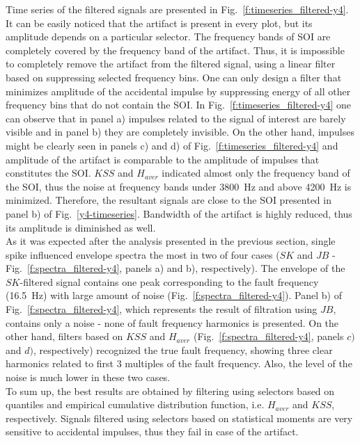 \documentclass[11pt]{article} %
\begin{document}
Time series of the filtered signals are presented in Fig.~\ref{f:timeseries_filtered-y4}. It can be easily noticed that the artifact is present in every plot, but its amplitude depends on a particular selector. The frequency bands of SOI are completely covered by the frequency band of the artifact. Thus, it is impossible to completely remove the artifact from the filtered signal, using a linear filter based on suppressing selected frequency bins. One can only design a filter that minimizes amplitude of the accidental impulse by suppressing energy of all other frequency bins that do not contain the SOI. In Fig.~\ref{f:timeseries_filtered-y4} one can observe that in panel a) impulses related to the signal of interest are barely visible and in panel b) they are completely invisible. On the other hand, impulses might be clearly seen in panels c) and d) of Fig.~\ref{f:timeseries_filtered-y4} and amplitude of the artifact is comparable to the amplitude of impulses that constitutes the SOI. $KSS$ and $H_{aver}$ indicated almost only the frequency band of the SOI, thus the noise at frequency bands under 3800~Hz and above 4200~Hz is minimized. Therefore, the resultant signals are close to the SOI presented in panel b) of Fig.~\ref{y4-timeseries}. Bandwidth of the artifact is highly reduced, thus its amplitude is diminished as well.\\
As it was expected after the analysis presented in the previous section, single spike influenced envelope spectra the most in two of four cases ($SK$ and $JB$ - Fig.~\ref{f:spectra_filtered-y4}, panels a) and b), respectively). The envelope of the $SK$-filtered signal contains one peak corresponding to the fault frequency (16.5~Hz) with large amount of noise (Fig.~\ref{f:spectra_filtered-y4}). Panel b) of Fig.~\ref{f:spectra_filtered-y4}, which represents the result of filtration using $JB$, contains only a noise - none of fault frequency harmonics is presented. On the other hand, filters based on $KSS$ and $H_{aver}$ (Fig.~\ref{f:spectra_filtered-y4}, panels $c)$ and $d)$, respectively) recognized the true fault frequency, showing three clear harmonics related to first 3 multiples of the fault frequency. Also, the level of the noise is much lower in these two cases.\\
To sum up, the best results are obtained by filtering using selectors based on quantiles and empirical cumulative distribution function, i.e. $H_{aver}$ and $KSS$, respectively. Signals filtered using selectors based on statistical moments are very sensitive to accidental impulses, thus they fail in case of the artifact.
\end{document}
